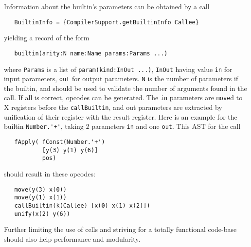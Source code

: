 \documentclass[a4paper]{memoir}
\begin{document}
Information about the builtin's parameters can be obtained by a call
\begin{lstlisting}
   BuiltinInfo = {CompilerSupport.getBuiltinInfo Callee}
\end{lstlisting}
yielding a record of the form
\begin{lstlisting}
   builtin(arity:N name:Name params:Params ...)
\end{lstlisting}
where \lstinline!Params! is a list of \lstinline!param(kind:InOut ...)!,
\lstinline!InOut! having value \lstinline!in! for input parameters,
\lstinline!out! for output parameters.
\lstinline!N! is the number of parameters if the builtin, and should be used to 
validate the number of arguments found in the call. If all is correct, opcodes can be generated.
The \lstinline!in! parameters are \lstinline!move!d to X registers before the \lstinline!callBuiltin!, and out parameters are
extracted by unification of their register with the result register. 
Here is an example for the builtin \lstinline!Number.'+'!, taking 2 parameters
\lstinline!in! and one \lstinline!out!. This AST for the call
\begin{lstlisting}
   fApply( fConst(Number.'+') 
           [y(3) y(1) y(6)] 
           pos)
\end{lstlisting}
should result in these opcodes:
\begin{lstlisting}
   move(y(3) x(0))
   move(y(1) x(1))
   callBuiltin(k(Callee) [x(0) x(1) x(2)])
   unify(x(2) y(6))
\end{lstlisting}


Further limiting the use of cells and striving for a totally functional code-base should also help 
performance and modularity.
\end{document}
